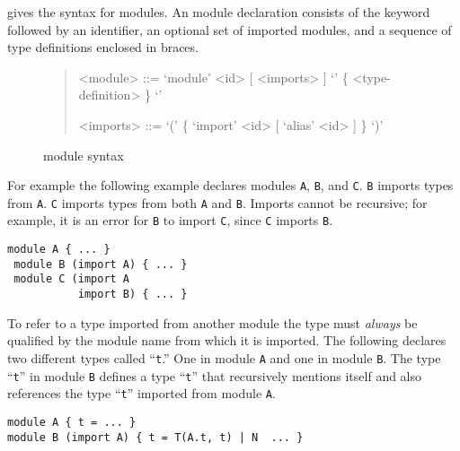  gives the syntax for modules.
An \asdl{} module declaration consists of the keyword 
followed by an identifier, an optional set of imported modules, and a
sequence of type definitions enclosed in braces.

\begin{figure}[t]
  \begin{quote}
    \begin{grammar}
      <module>  ::=  `module' <id> [ <imports> ] `{' \{ <type-definition> \} `}'

      <imports> ::=  `(' \{ `import' <id> [ `alias' <id> ] \} `)'
    \end{grammar}
  \end{quote}
  \caption{\asdl{} module syntax}
  \label{fig:module-syntax}
\end{figure}%

For example the
following example declares modules \lstinline[language=ASDL]!A!,
\lstinline[language=ASDL]!B!, and \lstinline[language=ASDL]!C!.
\lstinline[language=ASDL]!B! imports types from \lstinline[language=ASDL]!A!.
\lstinline[language=ASDL]!C! imports types from both \lstinline[language=ASDL]!A! and
\lstinline[language=ASDL]!B!.
Imports cannot be recursive; for example, it is an error for \lstinline[language=ASDL]!B! to
import \lstinline[language=ASDL]!C!, since \lstinline[language=ASDL]!C!
imports \lstinline[language=ASDL]!B!.
\begin{code}\begin{lstlisting}[language=ASDL]
 module A { ... } 
 module B (import A) { ... }
 module C (import A 
           import B) { ... }
\end{lstlisting}\end{code}%

To refer to a type imported from another module the type must
\emph{always} be qualified by the module name from which it is
imported.
The following declares two different types called ``\texttt{t}.''
One in module \texttt{A} and one in module \texttt{B}.
The type ``\texttt{t}'' in module \texttt{B} defines a type ``\texttt{t}'' that
recursively mentions itself and also references the type ``\texttt{t}'' imported
from module \texttt{A}.
\begin{code}\begin{lstlisting}[language=ASDL]
module A { t = ... } 
module B (import A) { t = T(A.t, t) | N  ... }
\end{lstlisting}\end{code}%

